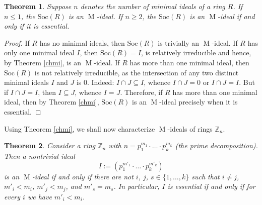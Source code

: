 \documentclass[11pt,leqno]{amsart}
\DeclareMathOperator{\m}{M}
\newtheorem{theorem}{Theorem}[section]
\theoremstyle{definition}
\theoremstyle{remark}
\numberwithin{equation}{section}
\numberwithin{equation}{section}
\begin{document}
\begin{theorem}
Suppose $n$ denotes the number of minimal ideals of a ring $R$. If $n\leqslant 1$, the $\mathrm{Soc}(R)$ is an $\m$-ideal. If $n\geqslant 2$, the $\mathrm{Soc}(R)$ is an $\m$-ideal if and only if it is essential.
\end{theorem}

\begin{proof}
If 
$R$ has no minimal ideals, then $\mathrm{Soc}(R)$ is trivially an $\m$-ideal. If $R$ has only one minimal ideal $I$, then $\mathrm{Soc}(R)=I$, is relatively irreducible and hence, by Theorem \ref{chmi}, is an $\m$-ideal. If $R$ has more than one minimal ideal, then $\mathrm{Soc}(R)$ is not relatively irreducible, as the intersection of any two distinct minimal ideals $I$ and $J$ is $0$. Indeed: $I\cap J\subseteq I$, whence $I\cap J=0$ or $I\cap J=I$. But if $I\cap J=I$, then $I\subseteq J$, whence $I=J$. Therefore, if $R$ has more than one minimal ideal, then by Theorem \ref{chmi}, $\mathrm{Soc}(R)$ is an $\m$-ideal precisely when it is essential.
\end{proof} 

Using Theorem \ref{chmi}, we shall now characterize $\m$-ideals of rings $\mathds{Z}_n$. 

\begin{theorem}\label{charzn}
Consider a ring $\mathds{Z}_n$ with  $n=p_1^{m_1}\cdot \ldots \cdot p_k^{m_k}$
(the prime decomposition). Then a nontrivial ideal
$$I:=\left(p_1^{m'_1}\cdot \ldots \cdot p_k^{m'_k}\right)$$
is an $\m$-ideal  if and only if there are not $i$, $j$, $s \in \{1,\ldots, k\}$ such that $i\neq j$, $m'_i < m_i$, $m'_j < m_j$, and $m'_s=m_s$. 
In particular, $I$ is essential if and only if for every $i$ we have $m'_i < m_i$.
\end{theorem}
\end{document}
